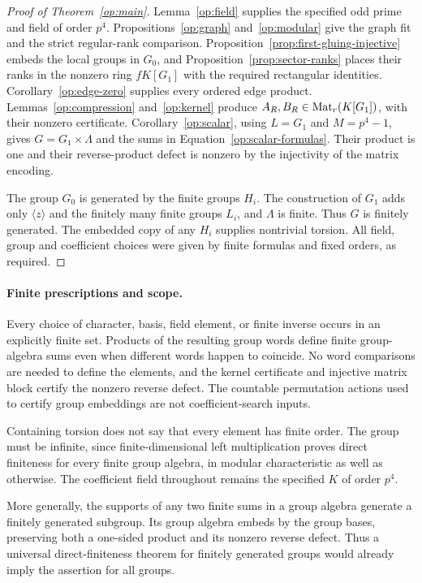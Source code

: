 \begin{proof}[Proof of Theorem~\ref{op:main}]
Lemma~\ref{op:field} supplies the specified odd prime and field of
order $p^4$. Propositions~\ref{op:graph} and~\ref{op:modular} give the
graph fit and the strict regular-rank comparison.
Proposition~\ref{prop:first-gluing-injective} embeds the local groups
in $G_0$, and Proposition~\ref{prop:sector-ranks} places their ranks in
the nonzero ring $fK[G_1]$ with the required rectangular identities.
Corollary~\ref{op:edge-zero} supplies every ordered edge product.
Lemmas~\ref{op:compression}
and~\ref{op:kernel} produce $A_R,B_R\in\operatorname{Mat}_r(K[G_1])$, with their
nonzero certificate. Corollary~\ref{op:scalar}, using $L=G_1$ and
$M=p^4-1$, gives $G=G_1\times\Lambda$ and the sums
in Equation~\eqref{op:scalar-formulas}. Their product is one and their
reverse-product defect is nonzero by the injectivity of the matrix
encoding.

The group $G_0$ is generated by the finite groups $H_i$. The construction
of $G_1$ adds only $\langle z\rangle$ and the finitely many finite
groups $L_i$, and $\Lambda$ is finite. Thus $G$ is finitely generated.
The embedded copy of any $H_i$ supplies nontrivial torsion. All field,
group and coefficient choices were given by finite formulas and fixed
orders, as required.
\end{proof}

\paragraph{Finite prescriptions and scope.}
Every choice of character, basis, field element, or finite inverse
occurs in an explicitly finite set. Products of the resulting group
words define finite group-algebra sums even when different words happen
to coincide. No word comparisons are needed to define the elements,
and the kernel certificate and injective matrix block certify the
nonzero reverse defect. The countable permutation actions used to
certify group embeddings are not coefficient-search inputs.

Containing torsion does not say that every element has finite order.
The group must
be infinite, since finite-dimensional left multiplication proves direct
finiteness for every finite group algebra, in modular characteristic as
well as otherwise. The coefficient field throughout remains the
specified $K$ of order $p^4$.

More generally, the supports of any two finite sums in a group algebra
generate a finitely generated subgroup. Its group algebra embeds by the
group bases, preserving both a one-sided product and its nonzero reverse
defect. Thus a universal direct-finiteness theorem for finitely generated
groups would already imply the assertion for all groups.

